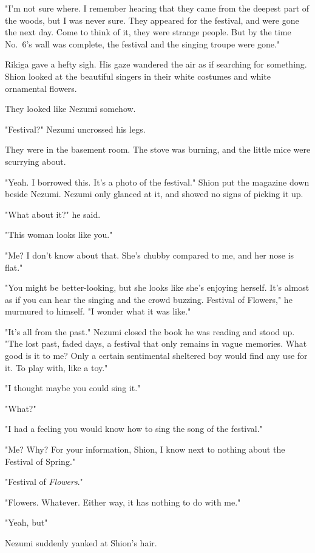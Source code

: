 "I'm not sure where. I remember hearing that they came from the deepest part of the woods, but I was never sure. They appeared for the festival, and were gone the next day. Come to think of it, they were strange people. But by the time No.~6's wall was complete, the festival and the singing troupe were gone."

Rikiga gave a hefty sigh. His gaze wandered the air as if searching for something. Shion looked at the beautiful singers in their white costumes and white ornamental flowers.

They looked like Nezumi somehow.

\mybreak

"Festival?"
Nezumi uncrossed his legs.

They were in the basement room. The stove was burning, and the little mice were scurrying about.

"Yeah. I borrowed this. It's a photo of the festival." Shion put the magazine down beside Nezumi. Nezumi only glanced at it, and showed no signs of picking it up.

"What about it?" he said.

"This woman looks like you."

"Me? I don't know about that. She's chubby compared to me, and her nose is flat."

"You might be better-looking, but she looks like she's enjoying herself. It's almost as if you can hear the singing and the crowd buzzing. Festival of Flowers," he murmured to himself. "I wonder what it was like."

"It's all from the past." Nezumi closed the book he was reading and stood up. "The lost past, faded days, a festival that only remains in vague memories. What good is it to me? Only a certain sentimental sheltered boy would find any use for it. To play with, like a toy."

"\el I thought maybe you could sing it."

"What?"

"I had a feeling you would know how to sing the song of the festival."

"Me? Why? For your information, Shion, I know next to nothing about the Festival of Spring."

"Festival of \emph{Flowers}."

"Flowers. Whatever. Either way, it has nothing to do with me."

"Yeah, but\el "

Nezumi suddenly yanked at Shion's hair.

